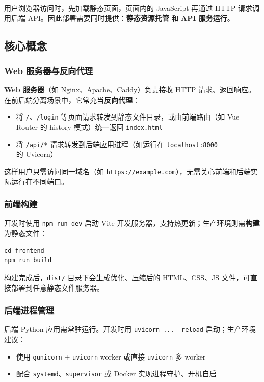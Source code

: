 \documentclass[11pt]{article}
\begin{document}
用户浏览器访问时，先加载静态页面，页面内的 JavaScript 再通过 HTTP 请求调用后端 API。因此部署需要同时提供：\textbf{静态资源托管} 和 \textbf{API 服务运行}。

\subsection{核心概念}

\subsubsection{Web 服务器与反向代理}

\textbf{Web 服务器}（如 Nginx、Apache、Caddy）负责接收 HTTP 请求、返回响应。在前后端分离场景中，它常充当\textbf{反向代理}：

\begin{itemize}
    \item 将 \texttt{/}、\texttt{/login} 等页面请求转发到静态文件目录，或由前端路由（如 Vue Router 的 history 模式）统一返回 \texttt{index.html}
    \item 将 \texttt{/api/*} 请求转发到后端应用进程（如运行在 \texttt{localhost:8000} 的 Uvicorn）
\end{itemize}

这样用户只需访问同一域名（如 \texttt{https://example.com}），无需关心前端和后端实际运行在不同端口。

\subsubsection{前端构建}

开发时使用 \texttt{npm run dev} 启动 Vite 开发服务器，支持热更新；生产环境则需\textbf{构建}为静态文件：

\begin{lstlisting}[caption=前端构建命令]
cd frontend
npm run build
\end{lstlisting}

构建完成后，\texttt{dist/} 目录下会生成优化、压缩后的 HTML、CSS、JS 文件，可直接部署到任意静态文件服务器。

\subsubsection{后端进程管理}

后端 Python 应用需常驻运行。开发时用 \texttt{uvicorn ... --reload} 启动；生产环境建议：

\begin{itemize}
    \item 使用 \texttt{gunicorn} + \texttt{uvicorn} worker 或直接 \texttt{uvicorn} 多 worker
    \item 配合 \texttt{systemd}、\texttt{supervisor} 或 Docker 实现进程守护、开机自启
\end{itemize}
\end{document}
